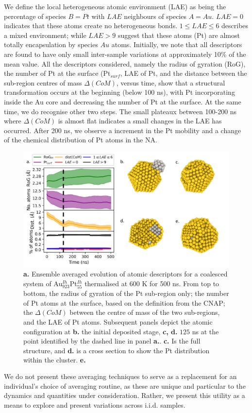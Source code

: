 We define the local heterogeneous atomic environment (LAE) as being the percentage of species $B=Pt$ with $LAE$ neighbours of species $A=Au$. $LAE=0$ indicates that these atoms create no heterogeneous bonds. 
%
$1 \leq LAE \leq 6$ describes a mixed environment; while $LAE>9$ suggest that these atoms (Pt) are almost totally encapsulation by species $Au$ atoms.
%
Initially, we note that all descriptors are found to have only small inter-sample variations at approximately 10\% of the mean value. 
All the descriptors considered, namely the radius of gyration (RoG), the number of Pt at the surface (Pt$_{surf}$, LAE of Pt, and the distance between the sub-region centres of mass $\Delta(CoM)$, versus time, show that a structural transformation occurs at the beginning (below 100 ns), with Pt incorporating inside the Au core and decreasing the number of Pt at the surface. At the same time, we do recognise other two steps.
The small plateaux between 100-200 ns where $\Delta(CoM)$ is almost flat indicates a small changes in the LAE has occurred. After 200 ns, we observe a increment in the Pt mobility and a change of the chemical distribution of Pt atoms in the NA.

\begin{figure}[ht!]
\includegraphics[width=16cm]{figures/Sapphire/Sapphir_Avg.pdf}
\caption{\textbf{a.} Ensemble averaged evolution of atomic descriptors for a coalesced system of Au$_{923}^{Ih}$Pt$_{55}^{Ih}$ thermalised at 600 K for 500 ns. From top to bottom, the radius of gyration of the Pt sub-region only; the number of Pt atoms at the surface, based on the definition from the CNAP; the $\Delta(CoM)$ between the centre of mass of the two sub-regions, and the LAE of Pt atoms. Subsequent panels depict the atomic configuration at \textbf{b.} the initial deposited stage, \textbf{c, d.} $125$ ns at the point identified by the dashed line in panel \textbf{a.}. \textbf{c.} Is the full structure, and \textbf{d.} is a cross section to show the Pt distribution within the cluster. \textbf{e.} }
\label{fig:ens-avg}
\end{figure}
We do not present these averaging techniques to serve as a replacement for an individual's choice of averaging routine, as these are unique and particular to the dynamics and quantities under consideration. Rather, we present this utility as a means to explore and present variations across i.i.d. samples.

